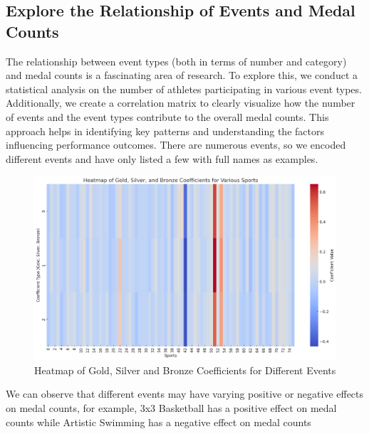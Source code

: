 \documentclass[12pt]{article}  %
\begin{document}
\subsection{Explore the Relationship of Events and Medal Counts}
The relationship between event types (both in terms of number and category) and medal counts is a fascinating area of research. To explore this, we conduct a statistical analysis on the number of athletes participating in various event types. Additionally, we create a correlation matrix to clearly visualize how the number of events and the event types contribute to the overall medal counts. This approach helps in identifying key patterns and understanding the factors influencing performance outcomes. There are numerous events, so we encoded different events and have only listed a few with full names as examples.
\begin{figure}[H]
        \centering
        \includegraphics[width=0.75\linewidth]{Heatmap.png}
        \caption{Heatmap of Gold, Silver and Bronze Coefficients for Different Events }
        \label{fig:enter-label}
    \end{figure}
\begin{table}[ht]
\centering
{}
\caption{Coefficients Matrix}
\end{table}
We can observe that different events may have varying positive or negative effects on medal counts, for example, 3x3 Basketball has a positive effect on medal counts while Artistic Swimming has a negative effect on medal counts
\end{document}
